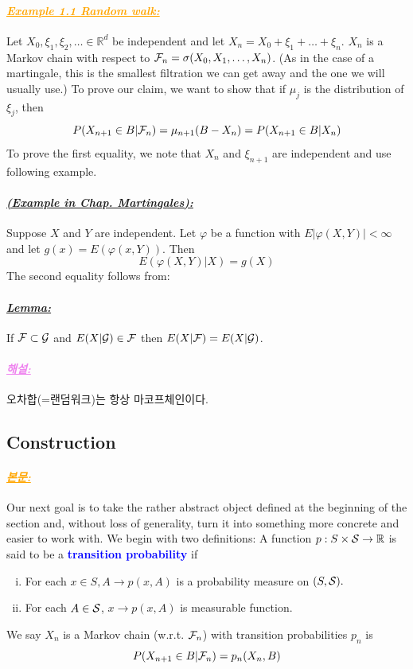 \documentclass[12pt,oneside,english,a4paper]{article}
\newcommand{\para}[1]{\paragraph{\LARGE\it\underline{\textbf{#1:}}}\LARGE}
\newcommand{\paraviolet}[1]{\paragraph{\LARGE\textcolor{violet}{\it\underline{\textbf{#1:}}}}\LARGE}
\newcommand{\paraorange}[1]{\paragraph{\LARGE\textcolor{orange}{\it\underline{\textbf{#1:}}}}\LARGE}
\begin{document}
\paraorange{Example 1.1 Random walk} Let $X_0,\xi_1,\xi_2,\dots \in \mathbb{R}^d$ be independent and let $X_n=X_0+\xi_1+\dots+\xi_n$. $X_n$ is a Markov chain with respect to ${\cal F}_n=\sigma(X_0,X_1,\dots,X_n)$. (As in the case of a martingale, this is the smallest filtration we can get away and the one we will usually use.) To prove our claim, we want to show that if $\mu_j$ is the distribution of $\xi_j$, then 
\[
P(X_{n+1} \in B | {\cal F}_n)=\mu_{n+1}(B-X_n)=P(X_{n+1}\in B|X_n)
\]
To prove the first equality, we note that $X_n$ and $\xi_{n+1}$ are independent and use following example. 
\para{(Example in Chap. Martingales)} Suppose $X$ and $Y$ are independent. Let $\varphi$ be a function with $E|\varphi(X,Y)|<\infty$ and let $g(x)=E(\varphi(x,Y))$. Then 
\[
E(\varphi(X,Y)|X)=g(X)
\]
The second equality follows from: 
\para{Lemma} If ${\cal F}\subset {\cal G}$ and $E(X|{\cal G})\in {\cal F}$ then $E(X|{\cal F})=E(X|{\cal G})$.

\paraviolet{해설} 오차합(=랜덤워크)는 항상 마코프체인이다. 

\subsection{Construction}
\paraorange{본문} Our next goal is to take the rather abstract object defined at the beginning of the section and, without loss of generality, turn it into something more concrete and easier to work with. We begin with two definitions: A function $p: S\times {\cal S} \to \mathbb{R} $ is said to be a \textcolor{blue}{\bf transition probability} if 
\begin{enumerate}[(i)]
	\item For each $x \in S, A\to p(x,A)$ is a probability measure on $(S,{\cal S}).$
	\item For each $A \in {\cal S}$, $x\to p(x,A)$ is measurable function. 
\end{enumerate}
We say $X_n$ is a Markov chain (w.r.t. ${\cal F}_n$) with transition probabilities $p_n$ is 
\[
P(X_{n+1}\in B|{\cal F}_n)=p_n(X_n,B)
\]
\end{document}
